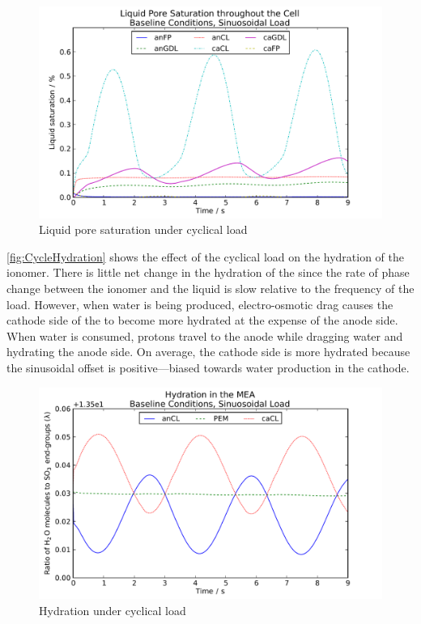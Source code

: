 \begin{figure}[htbp]
  \includegraphics[width=\linewidth]{Results/Cell/Model/Cycle/PoreSaturation}%
  \caption{Liquid pore saturation under cyclical load}%
  \label{fig:CyclePoreSaturation}
\end{figure}

\autoref{fig:CycleHydration} shows the effect of the cyclical load on the hydration of the ionomer.  There is little net change in the hydration of the  since the rate of phase change between the ionomer and the liquid is slow relative to the frequency of the load.  However, when water is being produced, electro-osmotic drag causes the cathode side of the  to become more hydrated at the expense of the anode side.  When water is consumed, protons travel to the anode while dragging water and hydrating the anode side.  On average, the cathode side is more hydrated because the sinusoidal offset is positive---biased towards water production in the cathode.

\begin{figure}[htbp]
  \includegraphics[width=\linewidth]{Results/Cell/Model/Cycle/Hydration}
  \caption{Hydration under cyclical load}%
  \label{fig:CycleHydration}
\end{figure}



